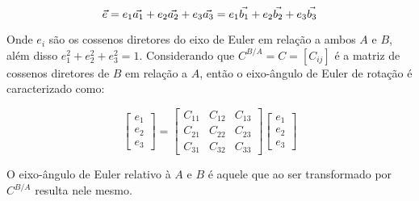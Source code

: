\begin{equation}\vec{e}=e_1\vec{a_1}+e_2\vec{a_2}+e_3\vec{a_3}\\=e_1\vec{b_1}+e_2\vec{b_2}+e_3\vec{b_3}\end{equation}

Onde \begin{math} e_i \end{math} são os cossenos diretores do eixo de Euler em relação a ambos \begin{math} A \end{math} e \begin{math} B \end{math}, além disso \begin{math} e_1^2+e_2^2+e_3^2=1 \end{math}. Considerando que \begin{math} C^{B/A}=C=[C_{ij}] \end{math} é a matriz de cossenos diretores de \begin{math} B \end{math} em relação a \begin{math} A \end{math}, então o eixo-ângulo de Euler de rotação é caracterizado como:

\begin{equation}\begin{bmatrix}e_1 \\ e_2 \\ e_3\end{bmatrix}=\begin{bmatrix}C_{11} & C_{12} &C_{13} \\C_{21} & C_{22} & C_{23}\\C_{31} & C_{32}  & C_{33}\end{bmatrix}\begin{bmatrix}e_1 \\ e_2 \\ e_3\end{bmatrix}\end{equation}

O eixo-ângulo de Euler relativo à $A$ e $B$ é aquele que ao ser transformado por $C^{B/A}$ resulta nele mesmo.

